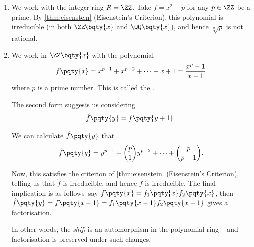 \begin{examples}
    \label{ex:application-of-eisenstein}%
    \begin{enumerate}
        \item We work with the integer ring \(R = \ZZ\). Take \(f = x^2 - p\) for any \(p \in \ZZ\) be a prime. By \autoref{thm:eisenstein} (Eisenstein's Criterion), this polynomial is irreducible (in both \(\ZZ\bqty{x}\) and \(\QQ\bqty{x}\)), and hence \(\sqrt[n]{p}\) is not rational.
        \item We work in \(\ZZ\bqty{x}\) with the polynomial
        \[
            f\pqty{x} = x^{p - 1} + x^{p - 2} + \cdots + x + 1 = \frac{x^p - 1}{x - 1}
        \]
        where \(p\) is a prime number. This is called the .

        The second form suggests us considering
        \[
            \hat{f} \pqty{y} = f\pqty{y + 1}.
        \]

        We can calculate \(\hat{f} \pqty{y}\) that
        \[
            \hat{f} \pqty{y} = y^{p - 1} + \binom{p}{1} y^{p - 2} + \cdots + \binom{p}{p - 1}.
        \]

        Now, this satisfies the criterion of \autoref{thm:eisenstein} (Eisenstein's Criterion), telling us that \(\hat{f}\) is irreducible, and hence \(f\) is irreducible. The final implication is as follows: say \(f\pqty{x} = f_1\pqty{x} f_2\pqty{x}\), then \(\hat{f} \pqty{y} = f\pqty{x - 1} = f_1\pqty{x - 1} f_2\pqty{x - 1}\) gives a factorisation.

        In other words, the \emph{shift} is an automorphism in the polynomial ring -- and factorisation is preserved under such changes.
    \end{enumerate}
\end{examples}